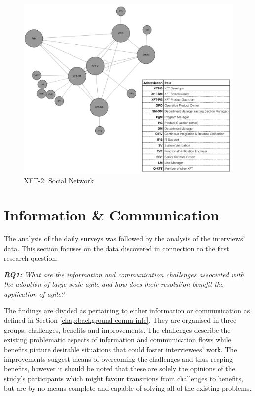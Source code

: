 \begin{figure}[h!]
  \centering
  \includegraphics[width=1\textwidth]{figures/sn/sn-picnic-legend.pdf}
  \caption{XFT-2: Social Network}
  \label{fig:picnic-sn}
\end{figure}

\section{Information \& Communication}

The analysis of the daily surveys was followed by the analysis of the interviews' data. This section focuses on the data discovered in connection to the first research question.

\textit{\textbf{RQ1:} What are the information and communication challenges associated with the adoption of large-scale agile and how does their resolution benefit the application of agile?}

The findings are divided as pertaining to either information or communication as defined in Section \ref{chap:background-comm-info}.
They are organised in three groups: challenges, benefits and improvements. The challenges describe the existing problematic aspects of information and communication flows while benefits picture desirable situations that could foster interviewees' work. The improvements suggest means of overcoming the challenges and thus reaping benefits, however it should be noted that these are solely the opinions of the study's participants which might favour transitions from challenges to benefits, but are by no means complete and capable of solving all of the existing problems.

